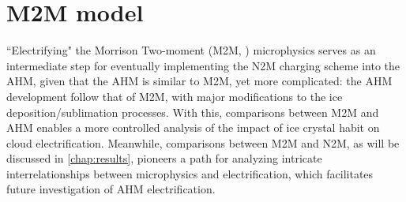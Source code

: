 \section{M2M model }
``Electrifying" the Morrison Two-moment (M2M, \cite{morrison2009impact}) microphysics serves as an intermediate step for eventually implementing the N2M charging scheme into the AHM, given that the AHM is similar to M2M, yet more complicated: the AHM development follow that of M2M, with major modifications to the ice deposition/sublimation processes. With this, comparisons between M2M and AHM enables a more controlled analysis of the impact of ice crystal habit on cloud electrification. Meanwhile, comparisons between M2M and N2M, as will be discussed in \ref{chap:results}, pioneers a path for analyzing intricate interrelationships between microphysics and electrification, which facilitates future investigation of AHM electrification.

